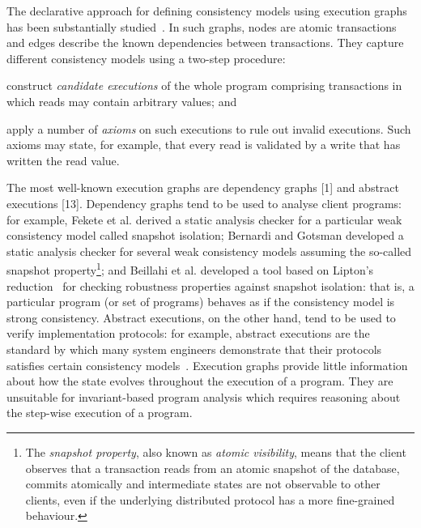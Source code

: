 The declarative approach for defining 
consistency models using execution graphs has been substantially
studied~\cite{sorry,I'velostthereferences}. 
In such graphs,  nodes are atomic transactions and edges describe the
known dependencies between transactions.
They capture different consistency models using  a two-step procedure:
\begin{enumerate*}
\item construct {\em candidate executions} of the whole program comprising
transactions in which reads may contain arbitrary values; and 
\item apply a number of \emph{axioms} on such executions to rule out invalid executions. 
Such axioms may state, for example, that every read is
validated by a write that has written the read value. 
\end{enumerate*}
The most well-known execution graphs are dependency graphs [1] and abstract
executions [13]. Dependency graphs tend to be used to analyse  client programs: for
example, 
Fekete et al. \citet{fekete-tods} derived 
a static analysis checker for a particular weak consistency model called
snapshot isolation;  Bernardi and Gotsman \citet{giovanni_concur16}
developed a static analysis checker for several weak consistency
models assuming the so-called snapshot property\footnote{The \emph{snapshot property}, 
also known as \emph{atomic visibility}, means that
the client observes that a transaction reads from an atomic snapshot
of the database, commits atomically and intermediate states are not observable to other clients, 
even if the underlying
distributed protocol has a more fine-grained behaviour.}; and 
Beillahi et al. \citet{snapshot-isolation-robust-tool} developed a tool based on Lipton's reduction~\cite{.}
for checking robustness properties against snapshot isolation: 
that is, a  particular program (or set of programs) behaves as if the consistency model is strong consistency. 
Abstract executions, on the other hand, tend to be used to verify  implementation protocols: for example,
 abstract executions are the  standard by which many system engineers
 demonstrate that their protocols satisfies  certain
 consistency models~\cite{??}.
Execution graphs provide little information about how the 
state evolves throughout the execution of a program.
They are unsuitable for invariant-based program analysis 
which requires reasoning about the step-wise execution of a program. 



